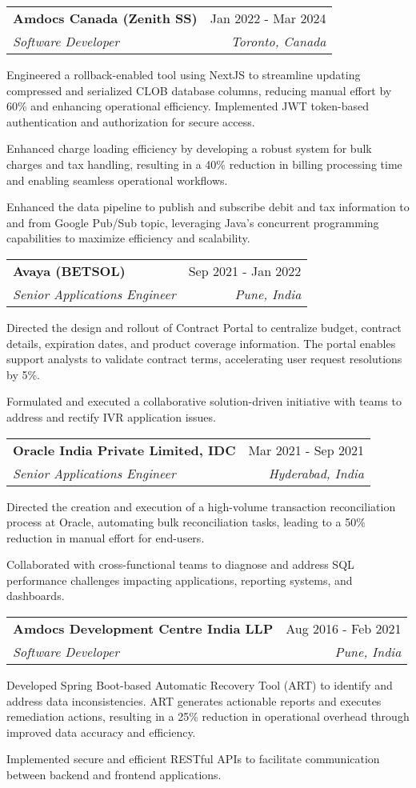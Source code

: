\documentclass[a4paper, 10pt]{article}
\makeatletter
\newcommand{\resumeItemNoSub}[1]{\item\small{{#1}}}
\newcommand{\resumeSubheading}[4]{
\vspace{4pt}\item[]
\begin{tabular*}{0.98\textwidth}{l@{\extracolsep{\fill}}r}
    \hspace{-10pt}\textbf{#1}       & #2                 \\
    \hspace{-10pt}\textit{\small#3} & \textit{\small #4} \\
\end{tabular*}\vspace{-5pt}
}
\newcommand{\resumeItemListStart}{\begin{itemize}}
\newcommand{\resumeItemListEnd}{\end{itemize}\vspace{-5pt}}
\makeatother
\begin{document}
\resumeSubheading{Amdocs Canada (Zenith SS)}{Jan 2022 - Mar 2024}{Software Developer}{Toronto, Canada}

\resumeItemNoSub{Engineered a rollback-enabled tool using NextJS to streamline updating compressed and serialized CLOB database columns, reducing manual effort by 60\% and enhancing operational efficiency. Implemented JWT token-based authentication and authorization for secure access.}
\resumeItemNoSub{Enhanced charge loading efficiency by developing a robust system for bulk charges and tax handling, resulting in a 40\% reduction in billing processing time and enabling seamless operational workflows.}
\resumeItemNoSub{Enhanced the data pipeline to publish and subscribe debit and tax information to and from Google Pub/Sub topic, leveraging Java's concurrent programming capabilities to maximize efficiency and scalability.}

\resumeSubheading{Avaya (BETSOL)}{Sep 2021 -  Jan 2022}{Senior Applications Engineer}{Pune, India}

\resumeItemNoSub{Directed the design and rollout of Contract Portal to centralize budget, contract details, expiration dates, and product coverage information. The portal enables support analysts to validate contract terms, accelerating user request resolutions by 5\%.}
\resumeItemNoSub{Formulated and executed a collaborative solution-driven initiative with teams to address and rectify IVR application issues.}


\resumeSubheading {Oracle India Private Limited, IDC}{Mar 2021 - Sep 2021}{Senior Applications Engineer}{Hyderabad, India}

\resumeItemNoSub{Directed the creation and execution of a high-volume transaction reconciliation process at Oracle, automating bulk reconciliation tasks, leading to a 50\% reduction in manual effort for end-users.}
\resumeItemNoSub{Collaborated with cross-functional teams to diagnose and address SQL performance challenges impacting applications, reporting systems, and dashboards.}

\resumeSubheading {Amdocs Development Centre India LLP}{Aug 2016 - Feb 2021}{Software Developer}{Pune, India}

\resumeItemNoSub{Developed Spring Boot-based Automatic Recovery Tool (ART) to identify and address data inconsistencies. ART generates actionable reports and executes remediation actions, resulting in a 25\% reduction in operational overhead through improved data accuracy and efficiency.}
\resumeItemNoSub{Implemented secure and efficient RESTful APIs to facilitate communication between backend and frontend applications.}
\end{document}
